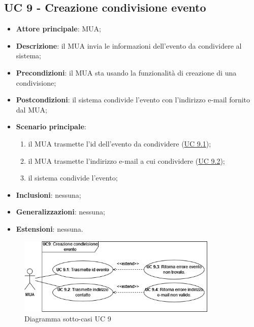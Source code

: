 \subsection{UC 9 - Creazione condivisione evento} \label{sec:UC9}

    \begin{itemize}
        \item \textbf{Attore principale}: MUA;
        \item \textbf{Descrizione}: il MUA invia le informazioni dell'evento da condividere al sistema;
        \item \textbf{Precondizioni}: il MUA sta usando la funzionalità di creazione di una condivisione;
        \item \textbf{Postcondizioni}: il sistema condivide l'evento con l'indirizzo e-mail fornito dal MUA;
        \item \textbf{Scenario principale}:
            \begin{enumerate}
                \item il MUA trasmette l'id dell'evento da condividere (\hyperref[sec:UC9.1]{UC 9.1});
                \item il MUA trasmette l'indirizzo e-mail a cui condividere (\hyperref[sec:UC9.2]{UC 9.2});
                \item il sistema condivide l'evento;
            \end{enumerate}
        \item \textbf{Inclusioni}: nessuna;
        \item \textbf{Generalizzazioni}: nessuna;
        \item \textbf{Estensioni}: nessuna.
    \end{itemize}

    \begin{figure}[H]
        \includegraphics[width=0.85\textwidth]{sections/uc_imgs/UC09.png}
        \centering
        \caption{Diagramma sotto-casi UC 9}
    \end{figure}

